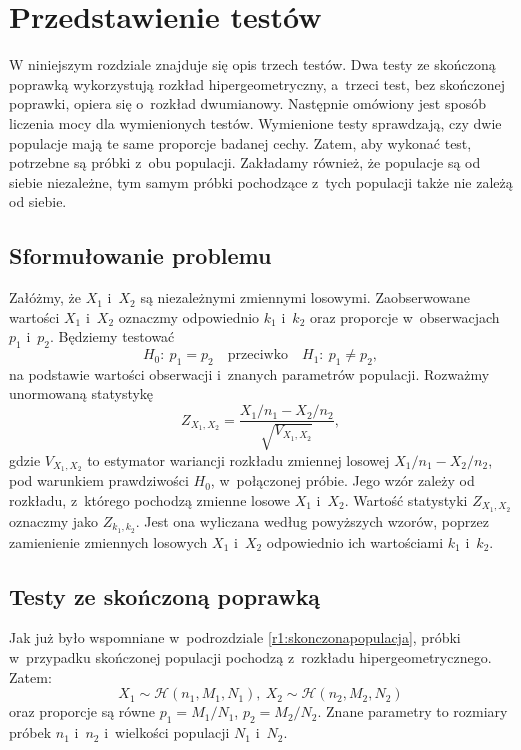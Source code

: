 \chapter{Przedstawienie testów}
\label{r2}
W niniejszym rozdziale znajduje się opis trzech testów. Dwa testy ze skończoną poprawką wykorzystują rozkład hipergeometryczny, a~trzeci test, bez skończonej poprawki, opiera się o~rozkład dwumianowy. Następnie omówiony jest sposób liczenia mocy dla wymienionych testów. Wymienione testy sprawdzają, czy dwie populacje mają te same proporcje badanej cechy. Zatem, aby wykonać test, potrzebne są próbki z~obu populacji. Zakładamy również, że populacje są od siebie niezależne, tym samym próbki pochodzące z~tych populacji także nie zależą od siebie. 

\section{Sformułowanie problemu}
Załóżmy, że $X_1$ i~$X_2$ są niezależnymi zmiennymi losowymi. Zaobserwowane wartości $X_1$ i~$X_2$ oznaczmy odpowiednio $k_1$ i~$k_2$ oraz proporcje w~obserwacjach $p_1$ i~$p_2$. Będziemy testować
\begin{equation}
H_0{:}\ p_1=p_2\quad \text{przeciwko} \quad H_1{:}\ p_1\neq p_2,
\end{equation}
na podstawie wartości obserwacji i~znanych parametrów populacji.
Rozważmy unormowaną statystykę
\begin{equation}
Z_{X_1,X_2} = \frac{X_1/n_1-X_2/n_2}{\sqrt{V_{X_1,X_2}}},
\end{equation}
gdzie $V_{X_1,X_2}$ to estymator wariancji rozkładu zmiennej losowej $X_1/n_1-X_2/n_2$, pod warunkiem prawdziwości $H_0$, w~połączonej próbie. Jego wzór zależy od rozkładu, z~którego pochodzą zmienne losowe $X_1$ i~$X_2$.
Wartość statystyki $Z_{X_1,X_2}$ oznaczmy jako $Z_{k_1,k_2}$. Jest ona wyliczana według powyższych wzorów, poprzez zamienienie zmiennych losowych $X_1$ i~$X_2$ odpowiednio ich wartościami $k_1$ i~$k_2$.

\section{Testy ze skończoną poprawką}
\label{r2:skonczonapoprawka}
Jak już było wspomniane w~podrozdziale \ref{r1:skonczonapopulacja}, próbki w~przypadku skończonej populacji pochodzą z~rozkładu hipergeometrycznego. Zatem:
\begin{equation}
X_1\sim \mathcal{H}(n_1,M_1,N_1),\ X_2\sim \mathcal{H}(n_2,M_2,N_2)
\end{equation}
oraz proporcje są równe $p_1=M_1/N_1$, $p_2=M_2/N_2$. Znane parametry to rozmiary próbek $n_1$ i~$n_2$ i~wielkości populacji $N_1$ i~$N_2$.

